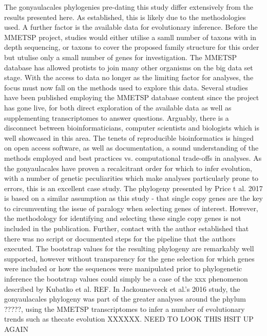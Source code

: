 \documentclass[12pt]{article}
\begin{document}
The gonyaulacales phylogenies pre-dating this study differ extensively from the results presented here. As established, this is likely due to the methodologies used. A further factor is the available data for evolutionary inference. Before the MMETSP project, studies would either utilise a samll number of taxons with in depth sequencing, or taxons to cover the proposed family structure for this order but utulise only a small number of genes for investigation. The MMETSP database has allowed protists to join many other organisms on the big data set stage. With the access to data no longer as the limiting factor for analyses, the focus must now fall on the methods used to explore this data.
Several studies have been published employing the MMETSP database content since the project has gone live, for both direct exploration of the available data as well as supplementing transcriptomes to answer questions. Arguably, there is a disconnect between bioinformaticians, computer scientists and biologists which is well showcased in this area. The tenets of reproducible bioinformatics is hinged on open access software, as well as documentation, a sound understanding of the methods employed and best practices vs. computational trade-offs in analyses. As the gonyaulacales have proven a recalcitrant order for which to infer evolution, with a number of genetic peculiarities which make analyses particularly prone to errors, this is an excellent case study.
The phylogeny presented by Price t al. 2017 is based on a similar assumption as this study - that single copy genes are the key to circumventing the issue of paralogy when selecting genes of interest. However, the methodology for identifying and selecting these single copy genes is not included in the publication. Further, contact with the author established that there was no script or documented steps for the pipeline that the authors executed. The bootstrap values for the resulting phylogeny are remarkably well supported, however without transparency for the gene selection for which genes were included or how the sequences were manipulated prior to phylogenetic inference the bootstrap values could simply be a case of the xxx phenomenon described by Kubatko et al. REF.
In Jackounevceck et al.'s 2016 study, the gonyaulacales phylogeny was part of the greater analyses around the phylum ?????, using the MMETSP transcriptomes to infer a number of evolutionary trends such as thecate evolution XXXXXX. NEED TO LOOK THIS HSIT UP AGAIN
\end{document}
